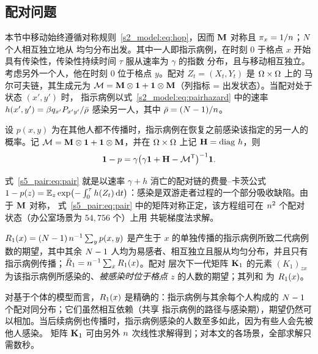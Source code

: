 \subsection{配对问题}\label{s5_pair:sec:pair}

本节中移动始终遵循对称规则~\eqref{s2_model:eq:hop}，因而 $\mathbf{M}$ 对称且 $\pi_x=1/n$；$N$ 个人相互独立地从
均匀分布出发。其中一人即指示病例，在时刻 $0$ 于格点 $x$ 开始具有传染性，传染性持续时间 $\tau$ 服从速率为 $\gamma$ 的指数
分布，且与移动相互独立。考虑另外一个人，他在时刻 $0$ 位于格点 $y$。配对 $Z_t=(X_t,Y_t)$ 是 $\Omega\times\Omega$ 上的
马尔可夫链，其生成元为 $\mathcal{M}=\mathbf{M}\otimes\mathbf{1}+\mathbf{1}\otimes\mathbf{M}$（列指标 = 出发状态）。当配对处于状态 $(x',y')$ 时，
指示病例以式~\eqref{s2_model:eq:pairhazard} 中的速率 $h(x',y')=\beta q_{x'}P_{x'y'}/\bar{\rho}$ 感染另一人，其中
$\bar{\rho}=(N-1)/n$。

\begin{proposition}[配对感染概率]\label{s5_pair:prop:pair}
  设 $p(x,y)$ 为在其他人都不传播时，指示病例在恢复之前感染该指定的另一人的概率。记
  $\mathcal{M}=\mathbf{M}\otimes\mathbf{1}+\mathbf{1}\otimes\mathbf{M}$，并在 $\Omega\times\Omega$ 上记 $\mathbf{H}=\operatorname{diag}\,h$，则
  \begin{equation}\label{s5_pair:eq:pair}
     \boldsymbol{1}-p=\gamma\bigl(\gamma\mathbf{1}+\mathbf{H}-\mathcal{M}^{\mathsf{T}}\bigr)^{-1}\boldsymbol{1} .
  \end{equation}
\end{proposition}

式~\eqref{s5_pair:eq:pair} 就是以速率 $\gamma+h$ 消亡的配对链的费曼–卡茨公式
$1-p(z)=\mathbb{E}_z\exp\bigl(-\int_0^{\tau}h(Z_t)\,\mathrm{d} t\bigr)$：感染是双游走者过程的一个部分吸收缺陷。由于 $\mathbf{M}$ 对称，
式~\eqref{s5_pair:eq:pair} 中的矩阵对称正定，该方程组可在 $n^2$ 个配对状态（办公室场景为 $54{,}756$ 个）上用
共轭梯度法求解。

\begin{definition}[配对层次再生数]\label{s5_pair:def:R1}
  $R_1(x)=(N-1)\,n^{-1}\sum_{y}p(x,y)$ 是产生于 $x$ 的单独传播的指示病例所致二代病例数的期望，其中其余
  $N-1$ 人均为易感者、相互独立且服从均匀分布，并且只有指示病例传播；$\bar{R}_1=n^{-1}\sum_xR_1(x)$。配对
  层次下一代矩阵 $\mathbf{K}_1$ 的元素 $(K_1)_{zx}$ 为该指示病例所感染的、\emph{被感染时位于格点 $z$} 的人数的期望；其列和
  为 $R_1(x)$。
\end{definition}

对基于个体的模型而言，$R_1(x)$ 是精确的：指示病例与其余每个人构成的 $N-1$ 个配对同分布；它们虽然相互依赖（共享
指示病例的路径与感染期），期望仍然可以相加。当后续病例也传播时，指示病例感染的人数至多如此，因为有些人会先被他人感染。
矩阵 $\mathbf{K}_1$ 可由另外 $n$ 次线性求解得到；对本文的各场景，全部求解只需数秒。

